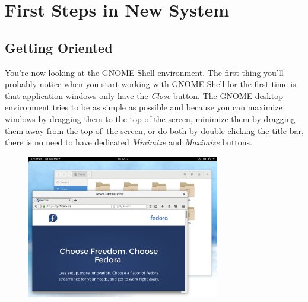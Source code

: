 \chapter*{First Steps in New System}
\section*{Getting Oriented}

You're now looking at the GNOME Shell environment. The first thing you'll probably notice when you start working with GNOME Shell for the first time is that application windows only have the \emph{Close} button. The GNOME desktop environment tries to be as simple as possible and because you can maximize windows by dragging them to the top of the screen, minimize them by dragging them away from the top of~the screen, or do both by double clicking the title bar, there is no need to have dedicated \emph{Minimize} and \emph{Maximize} buttons.

\bigskip

\begin{figure}[htbp]
\begin{center}
\includegraphics[width=0.75\textwidth]{img/shell-a}
 \label{fig:shell-a}
\end{center}
\end{figure}

